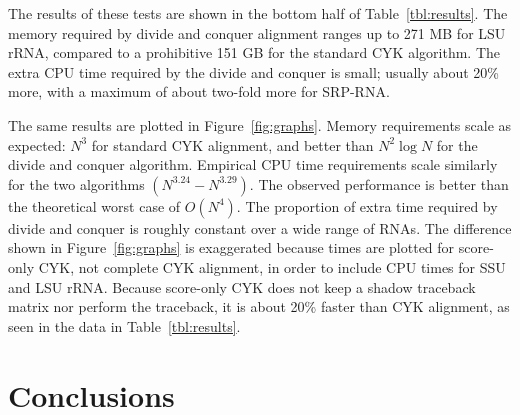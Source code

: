 \documentclass[11pt]{article}
\newif\ifdraft
\begin{document}
The results of these tests are shown in the bottom half of
Table~\ref{tbl:results}. The memory required by divide and conquer
alignment ranges up to 271 MB for LSU rRNA, compared to a prohibitive
151 GB for the standard CYK algorithm. The extra CPU time required by
the divide and conquer is small; usually about 20\% more, with a
maximum of about two-fold more for SRP-RNA.

\ifdraft
\begin{figure}[ht]
\begin{center}
\texttt{[image: Figures/graphs]}
\end{center}
\caption{\textbf{Empirical time and memory requirements for structural
alignment.} Plots of data from Table~\ref{tbl:results}. Filled
circles: divide and conquer algorithm; open circles: standard CYK
algorithm. Left: Memory use in megabytes on a log-log scale. Lines
represent weighted least-squares regression fits to the theoretically
expected memory scaling: $aN^2 \log N$ for divide and conquer (solid
line) and $aN^3$ for standard CYK (dashed line). Right: CPU times in
seconds on a log-log scale. Lines represent least-squares regression
fits to a power law ($aN^b$).  According to this fit, divide and
conquer time (solid line) empirically scales as $N^{3.24}$, and
standard CYK without traceback (dashed line) scales as $N^{3.29}$. A
line representing $O(N^4)$ scaling (the theoretical upper bound on
performance) is shown for comparison.}
\label{fig:graphs}
\end{figure}
\fi

The same results are plotted in Figure~\ref{fig:graphs}. Memory
requirements scale as expected: $N^3$ for standard CYK alignment, and
better than $N^2 \log N$ for the divide and conquer algorithm.
Empirical CPU time requirements scale similarly for the two algorithms
$(N^{3.24}-N^{3.29})$. The observed performance is better than the
theoretical worst case of $O(N^4)$. The proportion of extra time
required by divide and conquer is roughly constant over a wide range
of RNAs. The difference shown in Figure~\ref{fig:graphs} is
exaggerated because times are plotted for score-only CYK, not complete
CYK alignment, in order to include CPU times for SSU and LSU
rRNA. Because score-only CYK does not keep a shadow traceback matrix
nor perform the traceback, it is about 20\% faster than CYK alignment,
as seen in the data in Table~\ref{tbl:results}.

\section{Conclusions}
\end{document}
